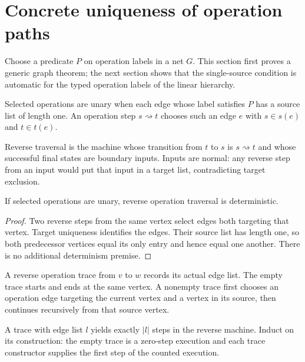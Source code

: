 \section{Concrete uniqueness of operation paths}
Choose a predicate $P$ on operation labels in a net $G$. This section first proves
a generic graph theorem; the next section shows that the single-source condition
is automatic for the typed operation labels of the linear hierarchy.

\begin{definition}\label{term:unary}
Selected operations are unary when each edge whose label satisfies $P$ has a
source list of length one. An operation step $s\rightsquigarrow t$ chooses such
an edge $e$ with $s\in s(e)$ and $t\in t(e)$.
\end{definition}
Reverse traversal is the machine whose transition from $t$ to $s$ is
$s\rightsquigarrow t$ and whose successful final states are boundary inputs.
Inputs are normal: any reverse step from an input would put that input in a
target list, contradicting target exclusion.
\begin{lemma}
If selected operations are unary, reverse operation traversal is deterministic.
\end{lemma}
\begin{proof}
Two reverse steps from the same vertex select edges both targeting that vertex.
Target uniqueness identifies the edges. Their source list has length one, so
both predecessor vertices equal its only entry and hence equal one another.
There is no additional determinism premise.
\end{proof}

\begin{definition}\label{term:operation-trace}
A reverse operation trace from $v$ to $w$ records its actual edge list. The empty
trace starts and ends at the same vertex. A nonempty trace first chooses an
operation edge targeting the current vertex and a vertex in its source, then
continues recursively from that source vertex.
\end{definition}
A trace with edge list $l$ yields exactly $|l|$ steps in the reverse machine.
Induct on its construction: the empty trace is a zero-step execution and each
trace constructor supplies the first step of the counted execution.

